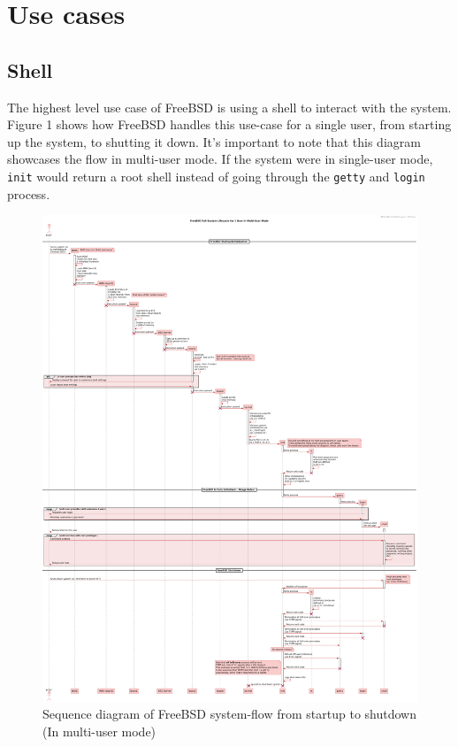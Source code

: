 \documentclass[12pt, dvipsnames, a4paper]{article}
\newcommand{\code}[1]{\texttt{#1}}
\begin{document}
\section{Use cases}

\subsection{Shell}
The highest level use case of FreeBSD is using a shell to interact with the system.
Figure 1 shows how FreeBSD handles this use-case for a single user,
from starting up the system, to shutting it down. It's important to note that
this diagram showcases the flow in multi-user mode. If the system were in
single-user mode, \code{init} would return a root shell instead of going through the
\code{getty} and \code{login} process\cite{bootprocess}\cite{init}.

\begin{figure}[!htb]
	\advance\leftskip-0.5cm
	\includegraphics[width = 570pt]{assets/sequence_diagrams/system-flow.pdf}
	\caption{Sequence diagram of FreeBSD system-flow from startup to shutdown (In multi-user mode) \cite{bootprocess}\cite{init}\cite{getty}\cite{login}}
\end{figure}
\clearpage
\end{document}
